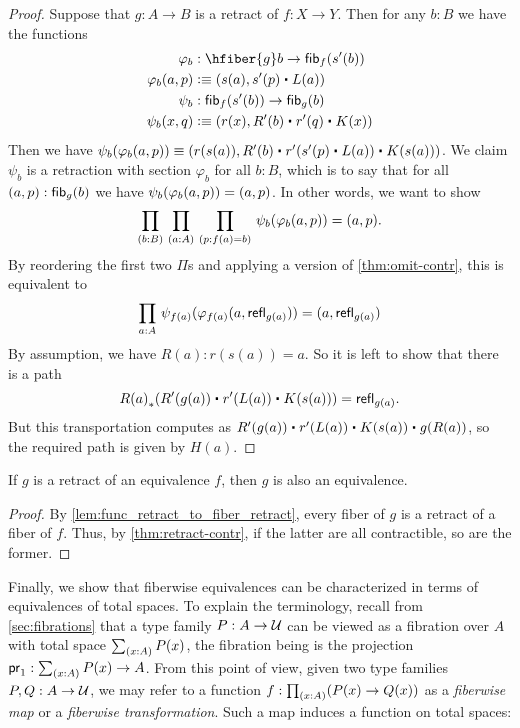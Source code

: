 \begin{proof}
Suppose that $g:A\to B$ is a retract of $f:X\to Y$. Then for any $b:B$ we have the functions
\begin{align*}
\varphi_b &:\hfiber{g}b\to\hfib{f}{s^\prime(b)}\\
\varphi_b(a,p) & \defeq \pairr{s(a),s^\prime(p)\ct L(a)}\\
\psi_b &:\hfib{f}{s^\prime(b)}\to\hfib{g}b\\
\psi_b(x,q) &\defeq \pairr{r(x),R^\prime(b)\ct r^\prime(q)\ct K(x)}
\end{align*}
Then we have $\psi_b(\varphi_b({a,p}))\equiv\pairr{r(s(a)),R^\prime(b)\ct r^\prime(s^\prime(p)\ct L(a))\ct K(s(a))}$.
We claim $\psi_b$ is a retraction with section $\varphi_b$ for all $b:B$, which is to say that for all $(a,p):{\mathsf{fib}}_{g}(b)$ we have $\psi_b(\varphi_b({a,p}))= {(a,p)}$.
In other words, we want to show
\begin{equation*}
\prd{b:B}{a:A}{p:f(a)=b} \psi_b(\varphi_b({a,p}))= \pairr{a,p}.
\end{equation*}
By reordering the first two $\Pi$s and applying a version of \autoref{thm:omit-contr}, this is equivalent to
\begin{equation*}
\prd{a:A}\psi_{f(a)}(\varphi_{f(a)}({a,\refl{g(a)}}))=\pairr{a,\refl{g(a)}}
\end{equation*}
By assumption, we have $R(a):r(s(a))= a$. So it is left to show that there is a path
\begin{equation*}
\trans{R(a)}{R^\prime(g(a))\ct r^\prime(L(a))\ct K(s(a))} = \refl{g(a)}.
\end{equation*}
But this transportation computes as $R^\prime(g(a))\ct r^\prime(L(a))\ct K(s(a))\ct g(R(a))$, so the required path is given by $H(a)$.
\end{proof}

\begin{thm}\label{thm:retract-equiv}
  If $g$ is a retract of an equivalence $f$, then $g$ is also an equivalence.
\end{thm}
\begin{proof}
  By \autoref{lem:func_retract_to_fiber_retract}, every fiber of $g$ is a retract of a fiber of $f$.
  Thus, by \autoref{thm:retract-contr}, if the latter are all contractible, so are the former.
\end{proof}

Finally, we show that fiberwise equivalences can be characterized in terms of equivalences of total spaces.
To explain the terminology, recall from \autoref{sec:fibrations} that a type family $P:A\to\mathcal{U}$ can be viewed as a fibration over $A$ with total space $\sm{x:A} P(x)$, the fibration being is the projection $\proj1:\sm{x:A} P(x) \to A$.
From this point of view, given two type families $P,Q:A\to\mathcal{U}$, we may refer to a function $f:\prd{x:A} (P(x)\to Q(x))$ as a \emph{fiberwise map} or a \emph{fiberwise transformation}.
Such a map induces a function on total spaces:

